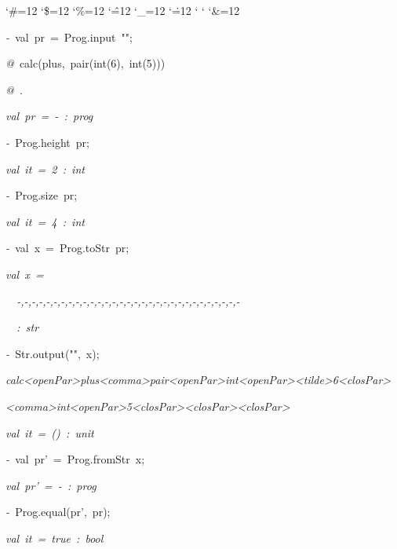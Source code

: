 \begin{list}{}
{\setlength{\leftmargin}{\leftmargini}
\setlength{\rightmargin}{0cm}
\setlength{\itemindent}{0cm}
\setlength{\listparindent}{0cm}
\setlength{\itemsep}{0cm}
\setlength{\parsep}{0cm}
\setlength{\labelsep}{0cm}
\setlength{\labelwidth}{0cm}
\catcode`\#=12
\catcode`\$=12
\catcode`\%=12
\catcode`\^=12
\catcode`\_=12
\catcode`\.=12
\catcode`
\catcode`
\catcode`\&=12
\ttfamily}
\small
\item[]\textsl{-\ }val\ pr\ =\ Prog.input\ "";
\item[]\textsl{@\ }calc(plus,\ pair(int(6),\ int(5)))
\item[]\textsl{@\ }.
\item[]\textsl{val\ pr\ =\ -\ :\ prog}
\item[]\textsl{-\ }Prog.height\ pr;
\item[]\textsl{val\ it\ =\ 2\ :\ int}
\item[]\textsl{-\ }Prog.size\ pr;
\item[]\textsl{val\ it\ =\ 4\ :\ int}
\item[]\textsl{-\ }val\ x\ =\ Prog.toStr\ pr;
\item[]\textsl{val\ x\ =}
\item[]\textsl{\ \ -,-,-,-,-,-,-,-,-,-,-,-,-,-,-,-,-,-,-,-,-,-,-,-,-,-,-,-,-,-,-}
\item[]\textsl{\ \ :\ str}
\item[]\textsl{-\ }Str.output("",\ x);
\item[]\textsl{calc<openPar>plus<comma>pair<openPar>int<openPar><tilde>6<closPar>}
\item[]\textsl{<comma>int<openPar>5<closPar><closPar><closPar>}
\item[]\textsl{val\ it\ =\ ()\ :\ unit}
\item[]\textsl{-\ }val\ pr'\ =\ Prog.fromStr\ x;
\item[]\textsl{val\ pr'\ =\ -\ :\ prog}
\item[]\textsl{-\ }Prog.equal(pr',\ pr);
\item[]\textsl{val\ it\ =\ true\ :\ bool}
\end{list}
